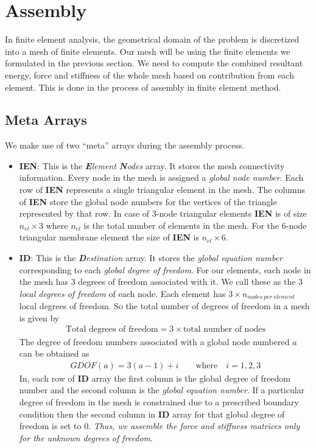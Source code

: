 \documentclass[../main.tex]{subfiles}
\begin{document}
\section{Assembly}
In finite element analysis, the geometrical domain of the problem is
discretized into a mesh of finite elements. Our mesh will be using the
finite elements we formulated in the previous section. We need to
compute the combined resultant energy, force and stiffness of the
whole mesh based on contribution from each element. This is done in
the process of assembly in finite element method.
\subsection{Meta Arrays}
We make use of two ``meta'' arrays during the assembly process.
\begin{itemize}
\item \textbf{IEN}: This is the \textit{\textbf{E}lement
    \textbf{N}odes} array. It stores the mesh connectivity
  information. Every node in the mesh is assigned a \textit{global
    node number}. Each row of \textbf{IEN} represents a single
  triangular element in the mesh. The columns of \textbf{IEN} store
  the global node numbers for the vertices of the triangle represented
  by that row. In case of 3-node triangular elements \textbf{IEN} is
  of size $n_{el}\times3$ where $n_{el}$ is the total number of
  elements in the mesh. For the 6-node triangular membrane element the
  size of \textbf{IEN} is $n_{el}\times6$.
\item \textbf{ID}: This is the \textit{\textbf{D}estination} array. It
  stores the \textit{global equation number} corresponding to each
  \textit{global degree of freedom}. For our elements, each node in
  the mesh has 3 degrees of freedom associated with it. We call these
  as the 3 \textit{local degrees of freedom} of each node. Each
  element has $3\times n_{nodes\ per\ element}$ local degrees of
  freedom. So the total number of degrees of freedom in a mesh is
  given by
  \begin{align*}
    \text{Total degrees of freedom} = 3\times \text{total number of nodes}
  \end{align*}
  The degree of freedom numbers associated with a global node numbered
  $a$ can be obtained as
  \begin{align*}
    GDOF(a) = 3(a-1) + i \qquad \text{where}\quad i = 1,2,3
  \end{align*}
  In, each row of \textbf{ID} array the first column is the global
  degree of freedom number and the second column is the \textit{global
    equation number}. If a particular degree of freedom in the mesh is
  constrained due to a prescribed boundary condition then the second
  column in \textbf{ID} array for that global degree of freedom is set
  to 0. \textit{Thus, we assemble the force and stiffness matrices
    only for the unknown degrees of freedom}.
\end{itemize}
\end{document}
